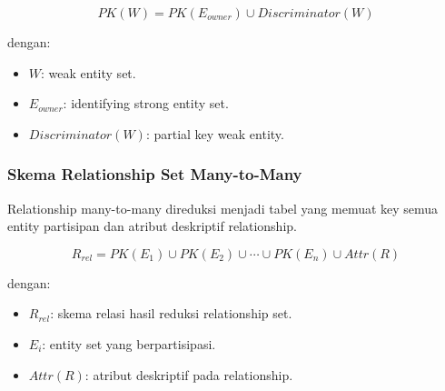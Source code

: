 \begin{equation}
    PK(W) = PK(E_{owner}) \cup Discriminator(W)
    \label{eq:weak-entity-key}
\end{equation}

dengan:
\begin{itemize}
    \item \(W\): weak entity set.
    \item \(E_{owner}\): identifying strong entity set.
    \item \(Discriminator(W)\): partial key weak entity.
\end{itemize}

\subsubsection{Skema Relationship Set Many-to-Many}

\begin{jawab}
Relationship many-to-many direduksi menjadi tabel yang memuat key semua entity partisipan dan atribut deskriptif relationship.
\end{jawab}

\begin{equation}
    R_{rel} = PK(E_1) \cup PK(E_2) \cup \cdots \cup PK(E_n) \cup Attr(R)
    \label{eq:relationship-reduction}
\end{equation}

dengan:
\begin{itemize}
    \item \(R_{rel}\): skema relasi hasil reduksi relationship set.
    \item \(E_i\): entity set yang berpartisipasi.
    \item \(Attr(R)\): atribut deskriptif pada relationship.
\end{itemize}
